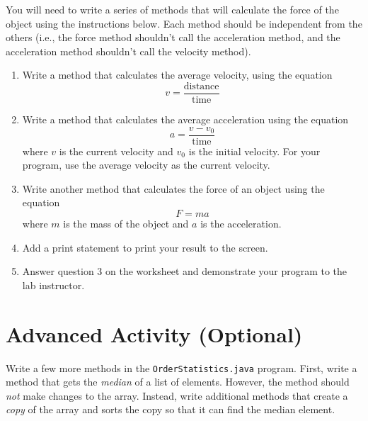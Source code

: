 \documentclass[12pt]{scrartcl}
\begin{document}
You will need to write a series of methods that will calculate the force of the 
object using the instructions below.  Each method should be independent 
from the others (i.e., the force method shouldn't call the acceleration method, 
and the acceleration method shouldn't call the velocity method).  

\begin{enumerate}
  \item Write a method that calculates the average velocity, using the equation 
	$$v = \frac{\textrm{distance}}{\textrm{time}}$$
  \item Write a method that calculates the average acceleration using the equation
	$$a = \frac{v - v_0}{\textrm{time}}$$
  	where $v$ is the current velocity and $v_0$ is the initial velocity.  For your 
	program, use the average velocity as the current velocity.
  \item Write another method that calculates the force of an object using the equation
	$$F = ma$$
	where $m$ is the mass of the object and $a$ is the acceleration.  
  \item Add a print statement to print your result to the screen.
  \item Answer question 3 on the worksheet and demonstrate your program to 
  	the lab instructor.
\end{enumerate}
	
\section{Advanced Activity (Optional)}

Write a few more methods in the \texttt{OrderStatistics.java} program.  First,
write a method that gets the \emph{median} of a list of elements.  However, the
method should \emph{not} make changes to the array.  Instead, write additional
methods that create a \emph{copy} of the array and sorts the copy so that it can
find the median element.  
\end{document}
